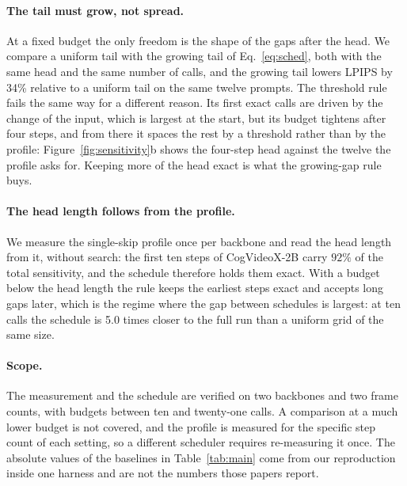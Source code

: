 \paragraph{The tail must grow, not spread.} At a fixed budget the only freedom is the shape of the gaps after the head. We compare a uniform tail with the growing tail of Eq.~\ref{eq:sched}, both with the same head and the same number of calls, and the growing tail lowers LPIPS by 34\% relative to a uniform tail on the same twelve prompts. The threshold rule fails the same way for a different reason. Its first exact calls are driven by the change of the input, which is largest at the start, but its budget tightens after four steps, and from there it spaces the rest by a threshold rather than by the profile: Figure~\ref{fig:sensitivity}b shows the four-step head against the twelve the profile asks for. Keeping more of the head exact is what the growing-gap rule buys.

\paragraph{The head length follows from the profile.} We measure the single-skip profile once per backbone and read the head length from it, without search: the first ten steps of CogVideoX-2B carry $92\%$ of the total sensitivity, and the schedule therefore holds them exact. With a budget below the head length the rule keeps the earliest steps exact and accepts long gaps later, which is the regime where the gap between schedules is largest: at ten calls the schedule is 5.0 times closer to the full run than a uniform grid of the same size.

\paragraph{Scope.} The measurement and the schedule are verified on two backbones and two frame counts, with budgets between ten and twenty-one calls. A comparison at a much lower budget is not covered, and the profile is measured for the specific step count of each setting, so a different scheduler requires re-measuring it once. The absolute values of the baselines in Table~\ref{tab:main} come from our reproduction inside one harness and are not the numbers those papers report.
